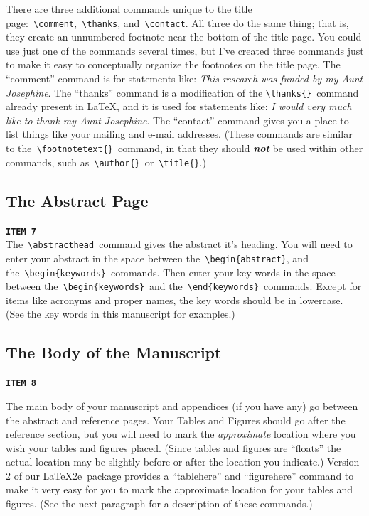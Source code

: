 \documentclass[titlepage,12pt]{article}
\begin{document}
There are three additional commands unique to the title
page:~\verb=\comment=,~\verb=\thanks=, and~\verb=\contact=. All
three do the same thing; that is, they create an unnumbered
footnote near the bottom of the title page. You could use just one
of the commands several times, but I've created three commands
just to make it easy to conceptually organize the footnotes on the
title page. The ``comment'' command is for statements like:
\textit{This research was funded by my Aunt Josephine}. The
``thanks'' command is a modification of the
\verb=\thanks{}=~command already present in \LaTeX, and it is used
for statements like: \textit{I would very much like to thank my
Aunt Josephine}. The ``contact'' command gives you a place to list
things like your mailing and e-mail addresses. (These commands are
similar to the~\verb=\footnotetext{}=~command, in that they should
{\bf \textit{not}} be used within other commands, such
as~\verb=\author{}=~or~\verb=\title{}=.)

\subsection{The Abstract Page}\label{abstract}

\noindent\texttt{\bf ITEM 7}\\[1.5ex]

The~\verb=\abstracthead=~command gives the abstract it's heading.
You will need to enter your abstract in the space between
the~\verb=\begin{abstract}=, and
the~\verb=\begin{keywords}=~commands. Then enter your key words in the
space between the~\verb=\begin{keywords}=~and
the~\verb=\end{keywords}=~commands. Except for items like acronyms
and proper names, the key words should be in lowercase. (See the
key words in this manuscript for examples.)


\subsection{The Body of the Manuscript}\label{body}

\noindent\texttt{\bf ITEM 8}\\[1.5ex]\label{floathere}

The main body of your manuscript and appendices (if you have any)
go between the abstract and reference pages. Your Tables and
Figures should go after the reference section, but you will need
to mark the \textit{approximate} location where you wish your
tables and figures placed. (Since tables and figures are
``floats'' the actual location may be slightly before or after the
location you indicate.) Version 2 of our \LaTeX2e\ package
provides a ``tablehere'' and ``figurehere'' command to make it
very easy for you to mark the approximate location for your tables
and figures. (See the next paragraph for a description of these
commands.)
\end{document}
